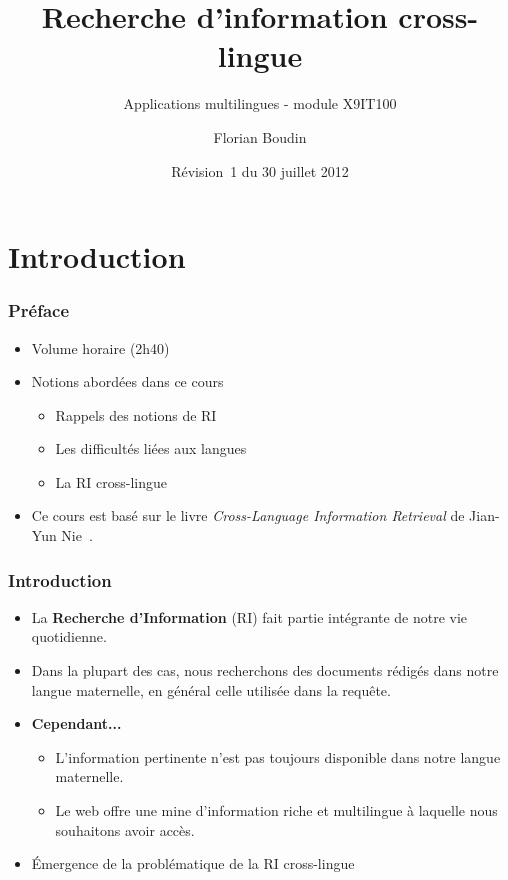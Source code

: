 \documentclass[12pt,aspectratio=43,dvipsnames,table]{beamer}
\title{Recherche d'information cross-lingue}
\subtitle{Applications multilingues - module X9IT100}
\author{Florian Boudin}
\institute{Département informatique, Université de Nantes}
\date[30 juillet 2013 / Rév.~1]{Révision~1 du 30 juillet 2012}
\begin{document}
\frame[plain]{\titlepage}


\section{Introduction}


\begin{frame}
    \frametitle{Préface}
    \begin{itemize} \itemsep10pt
        \item Volume horaire (2h40)
        \item Notions abordées dans ce cours
        \begin{itemize}
            \item Rappels des notions de RI
            \item Les difficultés liées aux langues
            \item La RI cross-lingue
        \end{itemize}
        \item Ce cours est basé sur le livre \textit{Cross-Language Information 
              Retrieval} de Jian-Yun Nie~\cite{DBLP:series/synthesis/2010Nie}.
    \end{itemize}
\end{frame}


\begin{frame}
    \frametitle{Introduction}
    \begin{itemize} \itemsep10pt
        \item La \textbf{Recherche d'Information} (RI) fait partie intégrante de
              notre vie quotidienne.
        \item Dans la plupart des cas, nous recherchons des documents rédigés 
              dans notre langue maternelle, en général celle utilisée dans la 
              requête.
        \item \textbf{Cependant...}
        \begin{itemize}
            \item L'information pertinente n'est pas toujours disponible dans 
                  notre langue maternelle.
            \item Le web offre une mine d'information riche et multilingue à 
                  laquelle nous souhaitons avoir accès.
        \end{itemize}
        \item \'Emergence de la problématique de la RI cross-lingue
    \end{itemize}
\end{frame}
\end{document}
